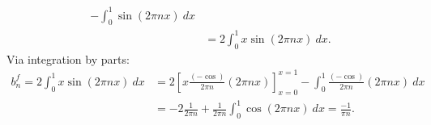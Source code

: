 \documentclass[11pt]{article}
\begin{document}
\begin{solution}
\begin{enumerate}
\begin{align*}
            - 
            \int_{ 0}^{1} \sin(2 \pi n x) \ dx 
            \\&= 
            2 
            \int_{ 0}^{1} x \sin(2 \pi n x) \ dx 
            .
        \end{align*}
        Via integration by parts:
        \begin{align*}
            b^{f}_{n}
            = 
            2 
            \int_{ 0}^{1} x \sin(2 \pi n x) \ dx 
            &
            =
            2 
            \left[ x \frac{(-\cos)}{2\pi n}(2 \pi n x) \right]_{x=0}^{x=1}
            -
            \int_{0}^{1} \frac{(-\cos)}{2\pi n}(2 \pi n x) \ dx 
            \\&= 
            -
            2 
            \frac{1}{2\pi n}
            + 
            \frac{1}{2\pi n}
            \int_{0}^{1} \cos(2 \pi n x) \ dx 
            =
            \frac{-1}{\pi n}
            .
        \end{align*}


\end{enumerate}
\end{solution}
\end{document}
